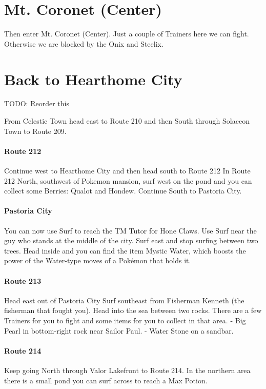 \documentclass[11pt]{article}
\begin{document}
% 


\section{Mt. Coronet (Center)}\label{sec:mt.-coronet-(center)}
Then enter Mt. Coronet (Center).
Just a couple of Trainers here we can fight.
Otherwise we are blocked by the Onix and Steelix.



\section{Back to Hearthome City}\label{sec:back-to-hearthome-city}
TODO: Reorder this

From Celestic Town head east to Route 210 and then South through
Solaceon Town to Route 209.

\paragraph{Route 212}
Continue west to Hearthome City and then head south to Route 212
In Route 212 North, southwest of Pokemon mansion, surf west on the pond and
you can collect some Berries: Qualot and Hondew.
Continue South to Pastoria City.

\paragraph{Pastoria City}
You can now use Surf to reach the TM Tutor for Hone Claws.
Use Surf near the guy who stands at the middle of the city.
Surf east and stop surfing between two trees.
Head inside and you can find the item Mystic Water,
which boosts the power of the Water-type moves of a Pokémon that holds it.

\paragraph{Route 213}
Head east out of Pastoria City
Surf southeast from Fisherman Kenneth (the fisherman that fought you).
Head into the sea between two rocks.
There are a few Trainers for you to fight and some items for you to collect in that area.
- Big Pearl in bottom-right rock near Sailor Paul.
- Water Stone on a sandbar.

\paragraph{Route 214}
Keep going North through Valor Lakefront to Route 214.
In the northern area there is a small pond you can surf across to reach
a Max Potion.
\end{document}

